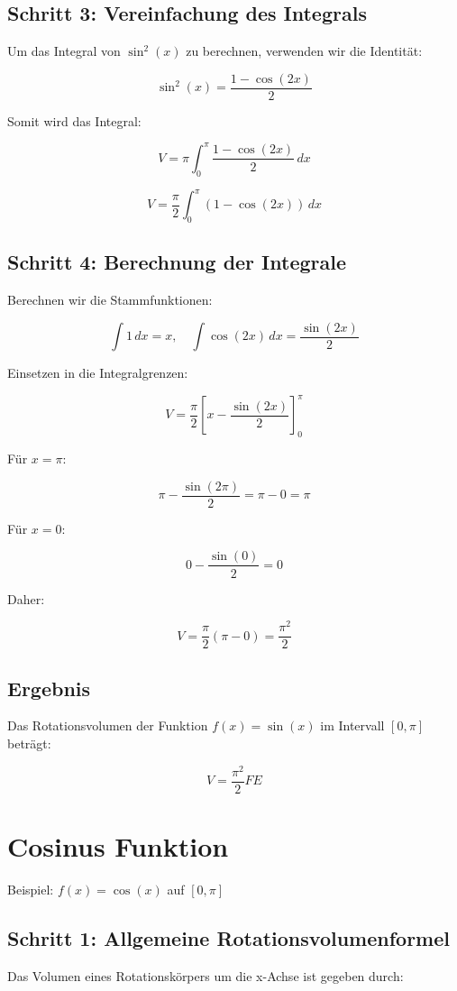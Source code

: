 \documentclass[a4paper,final]{report}
\begin{document}
\subsection{Schritt 3: Vereinfachung des Integrals}
Um das Integral von \( \sin^2(x) \) zu berechnen, verwenden wir die Identität:

\[
\sin^2(x) = \frac{1 - \cos(2x)}{2}
\]

Somit wird das Integral:

\[
V = \pi \int_0^\pi \frac{1 - \cos(2x)}{2} \, dx
\]

\[
V = \frac{\pi}{2} \int_0^\pi (1 - \cos(2x)) \, dx
\]

\subsection{Schritt 4: Berechnung der Integrale}
Berechnen wir die Stammfunktionen:

\[
\int 1 \, dx = x, \quad \int \cos(2x) \, dx = \frac{\sin(2x)}{2}
\]

Einsetzen in die Integralgrenzen:

\[
V = \frac{\pi}{2} \left[ x - \frac{\sin(2x)}{2} \right]_0^\pi
\]

Für \( x = \pi \):

\[
\pi - \frac{\sin(2\pi)}{2} = \pi - 0 = \pi
\]

Für \( x = 0 \):

\[
0 - \frac{\sin(0)}{2} = 0
\]

Daher:

\[
V = \frac{\pi}{2} (\pi - 0) = \frac{\pi^2}{2}
\]

\subsection{Ergebnis}
Das Rotationsvolumen der Funktion \( f(x) = \sin(x) \) im Intervall \( [0, \pi] \) beträgt:

\[
V = \frac{\pi^2}{2} FE
\]
\cite{lambacher_schweizer}

\section{Cosinus Funktion}
Beispiel: \( f(x) = \cos(x) \) auf \( [0, \pi] \)

\subsection{Schritt 1: Allgemeine Rotationsvolumenformel}
Das Volumen eines Rotationskörpers um die x-Achse ist gegeben durch:
\end{document}
